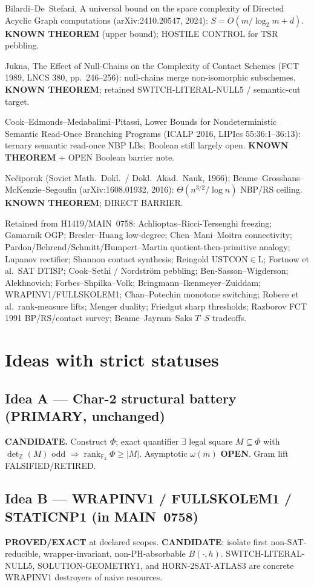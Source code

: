 \documentclass[11pt]{article}
\begin{document}
Bilardi--De~Stefani, A universal bound on the space complexity of Directed Acyclic Graph
computations (arXiv:2410.20547, 2024): $S=O(m/\log_2 m+d)$. \textbf{KNOWN THEOREM}
(upper bound); HOSTILE CONTROL for TSR pebbling.

Jukna, The Effect of Null-Chains on the Complexity of Contact Schemes
(FCT 1989, LNCS 380, pp.\ 246--256): null-chains merge non-isomorphic subschemes.
\textbf{KNOWN THEOREM}; retained SWITCH-LITERAL-NULL5 / semantic-cut target.

Cook--Edmonds--Medabalimi--Pitassi, Lower Bounds for Nondeterministic Semantic
Read-Once Branching Programs (ICALP 2016, LIPIcs 55:36:1--36:13):
ternary semantic read-once NBP LBs; Boolean still largely open.
\textbf{KNOWN THEOREM} + OPEN Boolean barrier note.

Ne\v{c}iporuk (Soviet Math.\ Dokl.\ / Dokl.\ Akad.\ Nauk, 1966);
Beame--Grosshans--McKenzie--Segoufin (arXiv:1608.01932, 2016):
$\Theta(n^{3/2}/\log n)$ NBP/RS ceiling. \textbf{KNOWN THEOREM}; DIRECT BARRIER.

Retained from H1419/MAIN~0758: Achlioptas--Ricci-Tersenghi freezing;
Gamarnik OGP; Bresler--Huang low-degree; Chen--Mani--Moitra connectivity;
Pardon/Behrend/Schmitt/Humpert--Martin quotient-then-primitive analogy;
Lupanov rectifier; Shannon contact synthesis; Reingold USTCON$\in$L;
Fortnow et al.\ SAT DTISP; Cook--Sethi / Nordstr\"om pebbling;
Ben-Sasson--Wigderson; Alekhnovich; Forbes--Shpilka--Volk;
Bringmann--Ikenmeyer--Zuiddam; WRAPINV1/FULLSKOLEM1;
Chan--Potechin monotone switching; Robere et al.\ rank-measure lifts;
Menger duality; Friedgut sharp thresholds; Razborov FCT 1991 BP/RS/contact survey;
Beame--Jayram--Saks $T$--$S$ tradeoffs.

\section*{Ideas with strict statuses}
\subsection*{Idea A --- Char-2 structural battery (PRIMARY, unchanged)}
\textbf{CANDIDATE.} Construct $\Phi$; exact quantifier
$\exists$ legal square $M\subseteq\Phi$ with $\det_{\mathbb Z}(M)$ odd
$\Rightarrow\operatorname{rank}_{\mathbb F_2}\Phi\ge|M|$. Asymptotic $\omega(m)$ \textbf{OPEN}.
Gram lift FALSIFIED/RETIRED.

\subsection*{Idea B --- WRAPINV1 / FULLSKOLEM1 / STATICNP1 (in MAIN~0758)}
\textbf{PROVED/EXACT} at declared scopes.
\textbf{CANDIDATE}: isolate first non-SAT-reducible, wrapper-invariant, non-PH-absorbable $B(\cdot,h)$.
SWITCH-LITERAL-NULL5, SOLUTION-GEOMETRY1, and HORN-2SAT-ATLAS3
are concrete WRAPINV1 destroyers of naive resources.
\end{document}
